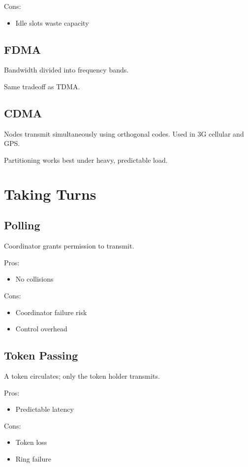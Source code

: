 \documentclass[11pt]{article}
\begin{document}
Cons:
\begin{itemize}
\item Idle slots waste capacity
\end{itemize}

\subsection{FDMA}
Bandwidth divided into frequency bands.

Same tradeoff as TDMA.

\subsection{CDMA}
Nodes transmit simultaneously using orthogonal codes.
Used in 3G cellular and GPS.

Partitioning works best under heavy, predictable load.

\section{Taking Turns}

\subsection{Polling}
Coordinator grants permission to transmit.

Pros:
\begin{itemize}
\item No collisions
\end{itemize}

Cons:
\begin{itemize}
\item Coordinator failure risk
\item Control overhead
\end{itemize}

\subsection{Token Passing}
A token circulates; only the token holder transmits.

Pros:
\begin{itemize}
\item Predictable latency
\end{itemize}

Cons:
\begin{itemize}
\item Token loss
\item Ring failure
\end{itemize}
\end{document}

